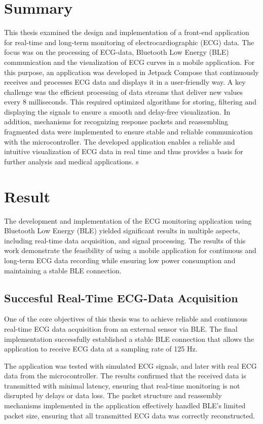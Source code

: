 {{	\section{Summary}
	This thesis examined the design and implementation of a front-end application for real-time and long-term monitoring of electrocardiographic (ECG) data. The focus was on the processing of ECG-data, Bluetooth Low Energy (BLE) communication and the visualization of ECG curves in a mobile application. For this purpose, an application was developed in Jetpack Compose that continuously receives and processes ECG data and displays it in a user-friendly way.
	A key challenge  was the efficient processing of data streams that deliver new values every 8 milliseconds. This required optimized algorithms for storing, filtering and displaying the signals to ensure a smooth and delay-free visualization. In addition, mechanisms for recognizing response packets and reassembling fragmented data were implemented to ensure stable and reliable communication with the microcontroller.
	The developed application enables a reliable and intuitive visualization of ECG data in real time and thus provides a basis for further analysis and medical applications.
	s
	
	\section{Result}
	{\large
	The development and implementation of the ECG monitoring application using Bluetooth Low Energy (BLE) yielded significant results in multiple aspects, including real-time data acquisition, and signal processing. The results of this work demonstrate the feasibility of using a mobile application for continuous and long-term ECG data recording while ensuring low power consumption and maintaining a stable BLE connection.}
	\subsection{Succesful Real-Time ECG-Data Acquisition}
	{\large
		One of the core objectives of this thesis was to achieve reliable and continuous real-time ECG data acquisition from an external sensor via BLE. The final implementation successfully established a stable BLE connection that allows the application to receive ECG data at a sampling rate of 125 Hz.
		
		The application was tested with simulated ECG signals, and later with real ECG data from the microcontroller. The results confirmed that the received data is transmitted with minimal latency, ensuring that real-time monitoring is not disrupted by delays or data loss. The packet structure and reassembly mechanisms implemented in the application effectively handled BLE’s limited packet size, ensuring that all transmitted ECG data was correctly reconstructed.
	}
}}
